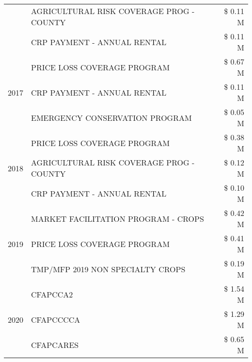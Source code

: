 \begin{tabular}{llr}
 & AGRICULTURAL RISK COVERAGE PROG - COUNTY      & \$ 0.11 M \\
 & CRP PAYMENT - ANNUAL RENTAL                   & \$ 0.11 M \\
\cline{1-3}
\multirow[t]{3}{*}{2017} & PRICE LOSS COVERAGE PROGRAM & \$ 0.67 M \\
 & CRP PAYMENT - ANNUAL RENTAL & \$ 0.11 M \\
 & EMERGENCY CONSERVATION PROGRAM & \$ 0.05 M \\
\cline{1-3}
\multirow[t]{3}{*}{2018} & PRICE LOSS COVERAGE PROGRAM & \$ 0.38 M \\
 & AGRICULTURAL RISK COVERAGE PROG - COUNTY & \$ 0.12 M \\
 & CRP PAYMENT - ANNUAL RENTAL & \$ 0.10 M \\
\cline{1-3}
\multirow[t]{3}{*}{2019} & MARKET FACILITATION PROGRAM - CROPS & \$ 0.42 M \\
 & PRICE LOSS COVERAGE PROGRAM & \$ 0.41 M \\
 & TMP/MFP 2019 NON SPECIALTY CROPS & \$ 0.19 M \\
\cline{1-3}
\multirow[t]{3}{*}{2020} & CFAPCCA2 & \$ 1.54 M \\
 & CFAPCCCCA & \$ 1.29 M \\
 & CFAPCARES & \$ 0.65 M \\
\cline{1-3}
\bottomrule
\end{tabular}
